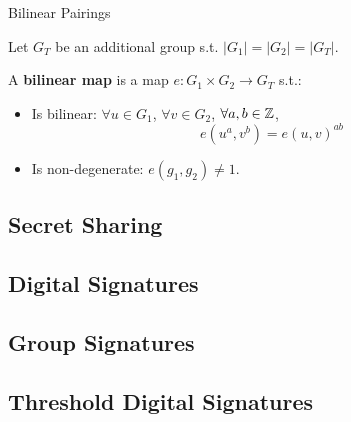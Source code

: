 \begin{frame}{Bilinear Pairings}
\begin{defn}
Let $G_T$ be an additional group s.t. $ |G_1| = |G_2| = |G_T| $. 

A \textbf{bilinear map} is a map $e: G_1 \times G_2 \rightarrow G_T$ s.t.:
\begin{itemize}
\item Is bilinear: $\forall u \in G_1$, $\forall v \in G_2$, $ \forall a,b \in {\mathbb Z}$, $$e(u^a, v^b) = e(u,v)^{ab} $$
\item Is non-degenerate: $e(g_1, g_2) \neq 1$.
\end{itemize}
\end{defn}

\end{frame}
\subsection{Secret Sharing}

\subsection{Digital Signatures}

\subsection{Group Signatures}

\subsection{Threshold Digital Signatures}